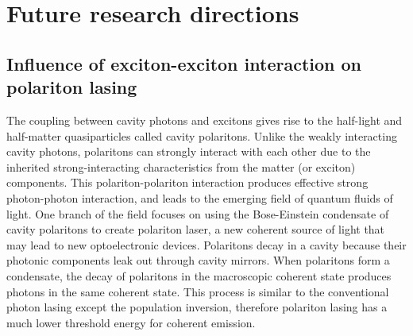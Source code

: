  




\section{Future research directions}

\subsection{Influence of exciton-exciton interaction on polariton lasing}
The coupling between cavity photons and excitons gives rise to the half-light and half-matter quasiparticles called 
cavity polaritons\cite{kavokin2007}. Unlike the weakly interacting cavity photons, polaritons can strongly interact with each 
other due to the inherited strong-interacting characteristics from the matter (or exciton) components. This polariton-polariton
interaction produces effective strong photon-photon interaction, and leads to the emerging field of quantum fluids of
 light\cite{carusotto2013}. One branch of the field focuses on using the  Bose-Einstein condensate of cavity polaritons to create
 polariton laser, a new coherent source of light that may lead to new optoelectronic devices\cite{pavlos2014}. 
 Polaritons decay in a cavity because their photonic components leak out through 
 cavity mirrors. When polaritons form a condensate, the decay of polaritons in the  macroscopic coherent state produces
 photons in the same coherent state. This process is similar to the conventional photon lasing except the population
 inversion, therefore polariton lasing has a much lower threshold energy for coherent emission\cite{daskalakis2003}. 

